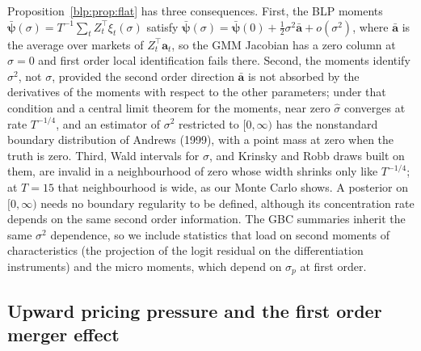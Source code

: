 Proposition~\ref{blp:prop:flat} has three consequences. First, the BLP moments
$\bar{\bm\psi}(\sigma) = T^{-1}\sum_t Z_t^\top\xi_t(\sigma)$ satisfy $\bar{\bm\psi}(\sigma) =
\bar{\bm\psi}(0) + \tfrac12\sigma^2 \bar{\bm a} + o(\sigma^2)$, where $\bar{\bm a}$ is the average over markets of $Z_t^\top\bm a_t$, so the GMM Jacobian has a zero column at
$\sigma=0$ and first order local identification fails there. Second, the moments identify
$\sigma^2$, not $\sigma$, provided the second order direction $\bar{\bm a}$ is not absorbed by the derivatives of the moments with respect to the other parameters; under that condition and a central limit theorem for the moments, near zero $\hat\sigma$ converges at rate $T^{-1/4}$, and an estimator of
$\sigma^2$ restricted to $[0,\infty)$ has the nonstandard boundary distribution of
Andrews (1999), with a point mass at zero when the truth is zero. Third, Wald intervals for
$\sigma$, and Krinsky and Robb draws built on them, are invalid in a neighbourhood of zero whose
width shrinks only like $T^{-1/4}$; at $T=15$ that neighbourhood is wide, as our Monte Carlo shows. A posterior on $[0,\infty)$ needs no boundary regularity to be defined, although its concentration rate depends on the same second order information. The GBC summaries inherit the same $\sigma^2$ dependence, so we include statistics that load on second moments of characteristics (the projection of the logit
residual on the differentiation instruments) and the micro moments, which depend on $\sigma_p$ at first order.

\subsection{Upward pricing pressure and the first order merger effect}




